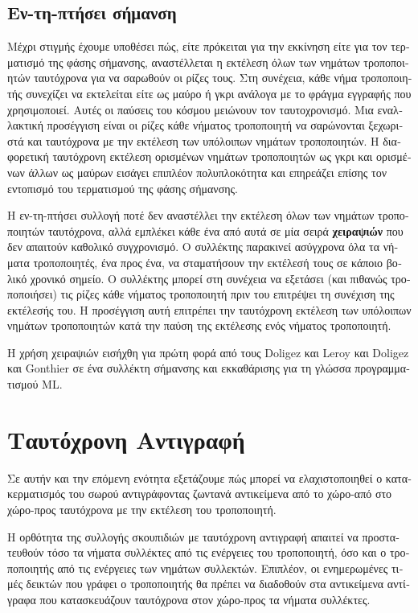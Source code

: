 \begin{greek}
\subsection{Εν-τη-πτήσει σήμανση}
Μέχρι στιγμής έχουμε υποθέσει πώς, είτε πρόκειται για την
εκκίνηση είτε για τον τερματισμό της φάσης σήμανσης, αναστέλλεται
η εκτέλεση όλων των νημάτων τροποποιητών ταυτόχρονα για να
σαρωθούν οι ρίζες τους. Στη συνέχεια, κάθε νήμα τροποποιητής
συνεχίζει να εκτελείται είτε ως μαύρο ή γκρι ανάλογα με το φράγμα
εγγραφής που χρησιμοποιεί. Αυτές οι παύσεις του κόσμου μειώνουν
τον ταυτοχρονισμό. Μια εναλλακτική προσέγγιση είναι οι ρίζες
κάθε νήματος τροποποιητή να σαρώνονται ξεχωριστά και ταυτόχρονα
με την εκτέλεση των υπόλοιπων νημάτων τροποποιητών. Η διαφορετική
ταυτόχρονη εκτέλεση ορισμένων νημάτων τροποποιητών ως γκρι και
ορισμένων άλλων ως μαύρων εισάγει επιπλέον πολυπλοκότητα και
επηρεάζει επίσης τον εντοπισμό του τερματισμού της φάσης σήμανσης.

Η εν-τη-πτήσει συλλογή ποτέ δεν αναστέλλει την εκτέλεση όλων
των νημάτων τροποποιητών ταυτόχρονα, αλλά εμπλέκει κάθε ένα από
αυτά σε μία σειρά \textbf{χειραψιών} που δεν απαιτούν καθολικό
συγχρονισμό. Ο συλλέκτης παρακινεί ασύγχρονα όλα τα νήματα
τροποποιητές, ένα προς ένα, να σταματήσουν την εκτέλεσή τους σε
κάποιο βολικό χρονικό σημείο. Ο συλλέκτης μπορεί στη συνέχεια
να εξετάσει (και πιθανώς τροποποιήσει) τις ρίζες κάθε νήματος
τροποποιητή πριν του επιτρέψει τη συνέχιση της εκτέλεσής του.
Η προσέγγιση αυτή επιτρέπει την ταυτόχρονη εκτέλεση των υπόλοιπων
νημάτων τροποποιητών κατά την παύση της εκτέλεσης ενός νήματος
τροποποιητή.

Η χρήση χειραψιών εισήχθη για πρώτη φορά από τους Doligez και
Leroy \cite{DBLP:conf/popl/DoligezL93} και Doligez και Gonthier
\cite{DBLP:conf/popl/DoligezG94} σε ένα συλλέκτη σήμανσης
και εκκαθάρισης για τη γλώσσα προγραμματισμού ML.

\section{Ταυτόχρονη Αντιγραφή}
Σε αυτήν και την επόμενη ενότητα εξετάζουμε πώς μπορεί να
ελαχιστοποιηθεί ο κατακερματισμός του σωρού αντιγράφοντας
ζωντανά αντικείμενα από το χώρο-από στο χώρο-προς ταυτόχρονα
με την εκτέλεση του τροποποιητή.

Η ορθότητα της συλλογής σκουπιδιών με ταυτόχρονη αντιγραφή
απαιτεί να προστατευθούν τόσο τα νήματα συλλέκτες από τις
ενέργειες του τροποποιητή, όσο και ο τροποποιητής από τις
ενέργειες των νημάτων συλλεκτών. Επιπλέον, οι ενημερωμένες
τιμές δεικτών που γράφει ο τροποποιητής θα πρέπει να
διαδοθούν στα αντικείμενα αντίγραφα που κατασκευάζουν
ταυτόχρονα στον χώρο-προς τα νήματα συλλέκτες.


\end{greek}
